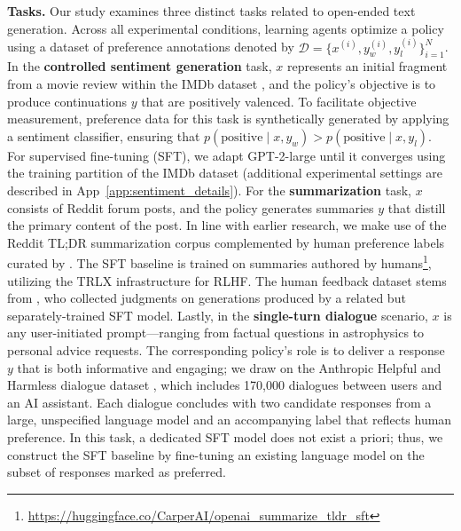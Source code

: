 \textbf{Tasks.} Our study examines three distinct tasks related to open-ended text generation. Across all experimental conditions, learning agents optimize a policy using a dataset of preference annotations denoted by $\mathcal{D}=\bigl\{x^{(i)}, y_w^{(i)}, y_l^{(i)}\bigr\}_{i=1}^N$. In the \textbf{controlled sentiment generation} task, $x$ represents an initial fragment from a movie review within the IMDb dataset \cite{maas-EtAl:2011:ACL-HLT2011}, and the policy’s objective is to produce continuations $y$ that are positively valenced. To facilitate objective measurement, preference data for this task is synthetically generated by applying a sentiment classifier, ensuring that $p(\text{positive}\mid x,y_w)>p(\text{positive}\mid x,y_l)$. For supervised fine-tuning (SFT), we adapt GPT-2-large until it converges using the training partition of the IMDb dataset (additional experimental settings are described in App~\ref{app:sentiment_details}). For the \textbf{summarization} task, $x$ consists of Reddit forum posts, and the policy generates summaries $y$ that distill the primary content of the post. In line with earlier research, we make use of the Reddit TL;DR summarization corpus \citep{volske-etal-2017-tl} complemented by human preference labels curated by \citeauthor{stiennon2022learning}. The SFT baseline is trained on summaries authored by humans\footnote{\url{https://huggingface.co/CarperAI/openai_summarize_tldr_sft}}, utilizing the TRLX \citep{leandro_von_werra_2023_7790115} infrastructure for RLHF. The human feedback dataset stems from \citeauthor{stiennon2022learning}, who collected judgments on generations produced by a related but separately-trained SFT model. Lastly, in the \textbf{single-turn dialogue} scenario, $x$ is any user-initiated prompt—ranging from factual questions in astrophysics to personal advice requests. The corresponding policy’s role is to deliver a response $y$ that is both informative and engaging; we draw on the Anthropic Helpful and Harmless dialogue dataset \citep{bai2022training}, which includes 170,000 dialogues between users and an AI assistant. Each dialogue concludes with two candidate responses from a large, unspecified language model and an accompanying label that reflects human preference. In this task, a dedicated SFT model does not exist a priori; thus, we construct the SFT baseline by fine-tuning an existing language model on the subset of responses marked as preferred.

